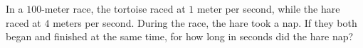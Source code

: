 In a $100$-meter race, the tortoise raced at $1$ meter per second, while the hare raced at $4$ meters per second. During the race, the hare took a nap. If they both began and finished at the same time, for how long in seconds did the hare nap?
